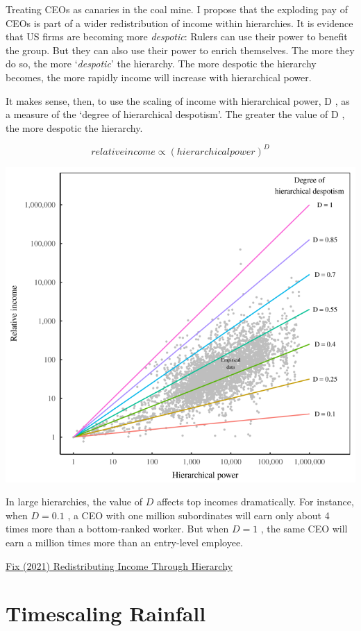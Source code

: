 \documentclass[
]{book}
\begin{document}
Treating CEOs as canaries in the coal mine. I propose that the exploding pay of CEOs is part of a wider redistribution of income within hierarchies. It is evidence that US firms are becoming more \emph{despotic}:
Rulers can use their power to benefit the group. But they can also use their power to enrich themselves. The more they do so, the more `\emph{despotic}' the hierarchy.
The more despotic the hierarchy becomes, the more rapidly income will increase with hierarchical power.

It makes sense, then, to use the scaling of income with hierarchical power, D , as a measure of the `degree of hierarchical despotism'. The greater the value of D , the more despotic the hierarchy.

\[relative income \propto (hierarchical power)^D\]

\includegraphics{fig/despotism_diagram.png}

In large hierarchies, the value of \(D\) affects top incomes dramatically. For instance, when \(D=0.1\) , a CEO with one million subordinates will earn only about 4 times more than a bottom-ranked worker. But when \(D=1\) , the same CEO will earn a million times more than an entry-level employee.

\href{https://economicsfromthetopdown.com/2021/10/24/redistributing-income-through-hierarchy/}{Fix (2021) Redistributing Income Through Hierarchy}

\hypertarget{timescaling-rainfall}{%
\section{Timescaling Rainfall}\label{timescaling-rainfall}}
\end{document}
